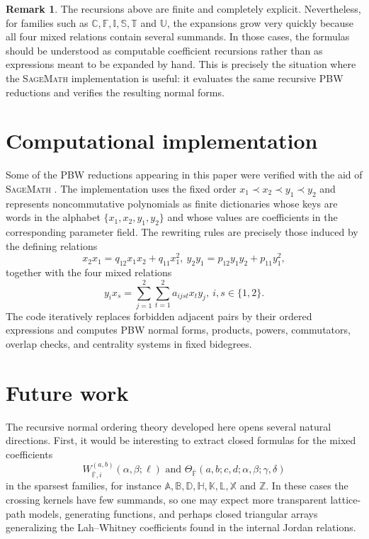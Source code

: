 \documentclass{amsart}
\theoremstyle{definition}
\newtheorem{remark}[theorem]{Remark}
\theoremstyle{remark}
\numberwithin{equation}{section}
\begin{document}
\begin{remark}\label{RemarkComputationalImplementationNormalOrdering}
The recursions above are finite and completely explicit. Nevertheless, for families such as $\mathbb{C},\mathbb{F},\mathbb{I},\mathbb{S},\mathbb{T}$ and $\mathbb{U}$, the expansions grow very quickly because all four mixed relations contain several summands. In those cases, the formulas should be understood as computable coefficient recursions rather than as expressions meant to be expanded by hand. This is precisely the situation where the \textsc{SageMath} implementation is useful: it evaluates the same recursive PBW reductions and verifies the resulting normal forms.
\end{remark}






\section{Computational implementation}\label{SubsectionComputationalImplementation}

Some of the PBW reductions appearing in this paper were verified with the aid of \textsc{SageMath} \cite{SageMath2026}. The implementation uses the fixed order
$x_1\prec x_2\prec y_1\prec y_2$ and represents noncommutative polynomials as finite dictionaries whose keys are words in the alphabet $\{x_1,x_2,y_1,y_2\}$ and whose values are coefficients in the corresponding parameter field. The rewriting rules are precisely those induced by the defining relations
$$
x_2x_1=q_{12}x_1x_2+q_{11}x_1^2,\
y_2y_1=p_{12}y_1y_2+p_{11}y_1^2,
$$
together with the four mixed relations
$$
y_ix_s=\sum_{j=1}^2\sum_{t=1}^2 a_{ijst}x_ty_j,
\ i,s\in\{1,2\}.
$$
The code iteratively replaces forbidden adjacent pairs by their ordered expressions and computes PBW normal forms, products, powers, commutators, overlap checks, and centrality systems in fixed bidegrees.

\section{Future work}\label{Futurework}

The recursive normal ordering theory developed here opens several natural directions. First, it would be interesting to extract closed formulas for the mixed coefficients
\[
W_{\bar{\mathbb{F}},i}^{(a,b)}(\alpha,\beta;\ell)
\text{ and }
\Theta_{\bar{\mathbb{F}}}(a,b;c,d;\alpha,\beta;\gamma,\delta)
\]
in the sparsest families, for instance $\mathbb{A},\mathbb{B},\mathbb{D},\mathbb{H},\mathbb{K},\mathbb{L},\mathbb{X}$ and $\mathbb{Z}$. In these cases the crossing kernels have few summands, so one may expect more transparent lattice-path models, generating functions, and perhaps closed triangular arrays generalizing the Lah--Whitney coefficients found in the internal Jordan relations.
\end{document}
